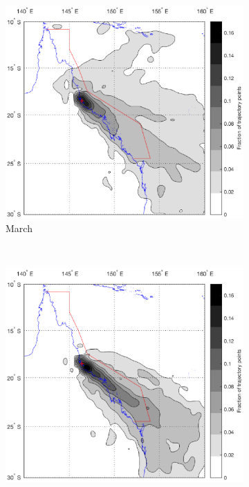 \begin{figure}[!t]\ContinuedFloat
    \centering
    \begin{subfigure}[b]{0.45\textwidth}
        \includegraphics[width=\textwidth]{Fig/Research/BT_Coast/Map_035.eps}
	    \caption{March}
	    \label{subfig:orph}
    \end{subfigure}
	~
	\begin{subfigure}[b]{0.45\textwidth}
		\includegraphics[width=\textwidth]{Fig/Research/BT_Coast/Map_045.eps}

\end{subfigure}
\end{figure}
